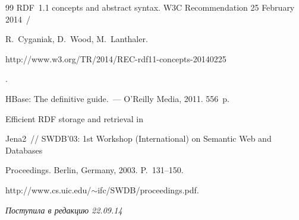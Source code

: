 {{\begin{thebibliography}{99}
RDF~1.1 concepts and abstract syntax. W3C Recommendation 25 February 2014~/

R.~Cyganiak, D.~Wood, M.~Lanthaler. {\sf

http://www.w3.org/TR/2014/REC-rdf11-concepts-20140225}.


 HBase: The definitive guide.~--- O'Reilly Media, 2011. 556~p.


 Efficient RDF storage and retrieval in

Jena2~/\!\!/ SWDB'03: 1st Workshop (International) on Semantic Web and Databases

Proceedings. Berlin, Germany, 2003. P.~131--150.

{\sf http://www.cs.\linebreak uic.edu/$\sim$ifc/SWDB/proceedings.pdf}.





      \end{thebibliography}

} }





\vspace*{-3pt}



\hfill{\small\textit{Поступила в редакцию 22.09.14}}



\newpage






















\def\tit{METHODS FOR MAPPING OF~COLLECTIONS PRESENTED

IN~NONTRADITIONAL DATA MODELS

INTO~THE~INTEGRATED REPRESENTATION}



